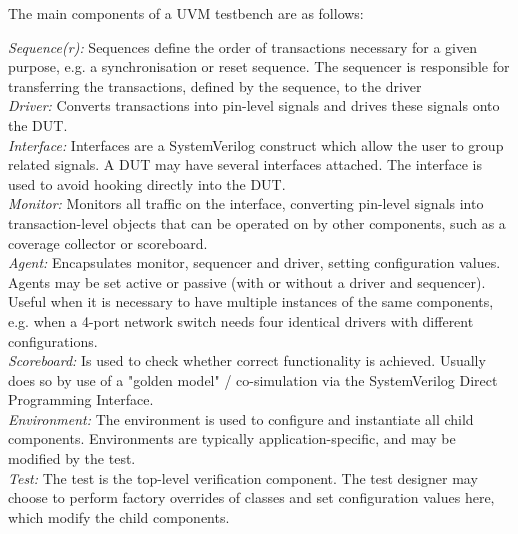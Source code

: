 \documentclass[conference]{IEEEtran}
\newcommand{\ducky}[1]{{\color{orange} Richard: #1}}
\newcommand{\kasper}[1]{{\color{purple} Kasper: #1}}
\begin{document}
The main components of a UVM testbench are as follows:

    \textit{Sequence(r):} Sequences define the order of transactions necessary for a given purpose, e.g. a synchronisation or reset sequence. The sequencer is responsible for transferring the transactions, defined by the sequence, to the driver\\
    \textit{Driver:} Converts transactions into pin-level signals and drives these signals onto the DUT.\\
    \textit{Interface:} Interfaces are a SystemVerilog construct which allow the user to group related signals. A DUT may have several interfaces attached. The interface is used to avoid hooking directly into the DUT. \\
    \textit{Monitor:} Monitors all traffic on the interface, converting pin-level signals into transaction-level objects that can be operated on by other components, such as a coverage collector or scoreboard. \\
    \textit{Agent:} Encapsulates monitor, sequencer and driver, setting configuration values. Agents may be set active or passive (with or without a driver and sequencer). Useful when it is necessary to have multiple instances of the same components, e.g. when a 4-port network switch needs four identical drivers with different configurations.\\
    \textit{Scoreboard:} Is used to check whether correct functionality is achieved. Usually does so by use of a "golden model" / co-simulation via the SystemVerilog Direct Programming Interface.\\
    \textit{Environment:} The environment is used to configure and instantiate all child components. Environments are typically application-specific, and may be modified by the test.\\
    \textit{Test:} The test is the top-level verification component. The test designer may choose to perform factory overrides of classes and set configuration values here, which modify the child components.
\end{document}
